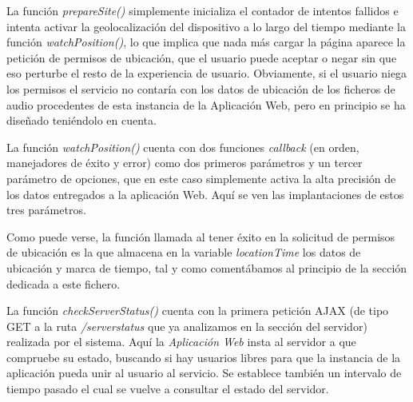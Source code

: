 La función \emph{prepareSite()} simplemente inicializa el contador de intentos fallidos e intenta activar la geolocalización del dispositivo a lo largo del tiempo mediante la función \emph{watchPosition()}, lo que implica que nada más cargar la página aparece la petición de permisos de ubicación, que el usuario puede aceptar o negar sin que eso perturbe el resto de la experiencia de usuario. Obviamente, si el usuario niega los permisos el servicio no contaría con los datos de ubicación de los ficheros de audio procedentes de esta instancia de la Aplicación Web, pero en principio se ha diseñado teniéndolo en cuenta.

La función \emph{watchPosition()} cuenta con dos funciones \emph{callback} (en orden, manejadores de éxito y error) como dos primeros parámetros y un tercer parámetro de opciones, que en este caso simplemente activa la alta precisión de los datos entregados a la aplicación Web. Aquí se ven las implantaciones de estos tres parámetros.


Como puede verse, la función llamada al tener éxito en la solicitud de permisos de ubicación es la que almacena en la variable \emph{locationTime} los datos de ubicación y marca de tiempo, tal y como comentábamos al principio de la sección dedicada a este fichero.

La función \emph{checkServerStatus()} cuenta con la primera petición AJAX (de tipo GET a la ruta \emph{/serverstatus} que ya analizamos en la sección del servidor) realizada por el sistema. Aquí la \emph{Aplicación Web} insta al servidor a que compruebe su estado, buscando si hay usuarios libres para que la instancia de la aplicación pueda unir al usuario al servicio. Se establece también un intervalo de tiempo pasado el cual se vuelve a consultar el estado del servidor.

